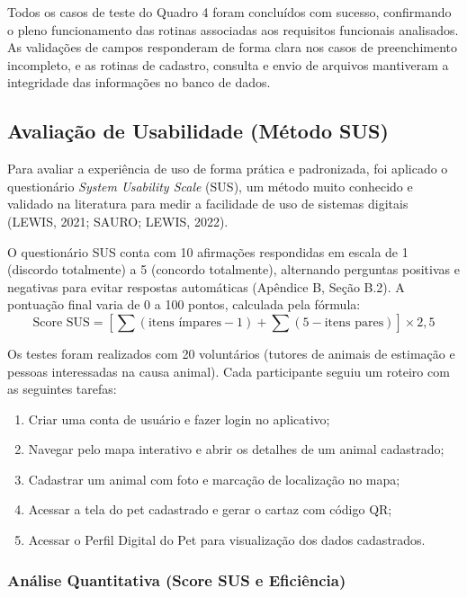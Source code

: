 Todos os casos de teste do Quadro 4 foram concluídos com sucesso, confirmando o pleno funcionamento das rotinas associadas aos requisitos funcionais analisados. As validações de campos responderam de forma clara nos casos de preenchimento incompleto, e as rotinas de cadastro, consulta e envio de arquivos mantiveram a integridade das informações no banco de dados.

\subsection{Avaliação de Usabilidade (Método SUS)}

Para avaliar a experiência de uso de forma prática e padronizada, foi aplicado o questionário \textit{System Usability Scale} (SUS), um método muito conhecido e validado na literatura para medir a facilidade de uso de sistemas digitais (LEWIS, 2021; SAURO; LEWIS, 2022). 

O questionário SUS conta com 10 afirmações respondidas em escala de 1 (discordo totalmente) a 5 (concordo totalmente), alternando perguntas positivas e negativas para evitar respostas automáticas (Apêndice B, Seção B.2). A pontuação final varia de 0 a 100 pontos, calculada pela fórmula:
\begin{equation}
    \text{Score SUS} = \left[ \sum (\text{itens ímpares} - 1) + \sum (5 - \text{itens pares}) \right] \times 2{,}5
\end{equation}

Os testes foram realizados com 20 voluntários (tutores de animais de estimação e pessoas interessadas na causa animal). Cada participante seguiu um roteiro com as seguintes tarefas:
\begin{enumerate}
    \item Criar uma conta de usuário e fazer login no aplicativo;
    \item Navegar pelo mapa interativo e abrir os detalhes de um animal cadastrado;
    \item Cadastrar um animal com foto e marcação de localização no mapa;
    \item Acessar a tela do pet cadastrado e gerar o cartaz com código QR;
    \item Acessar o Perfil Digital do Pet para visualização dos dados cadastrados.
\end{enumerate}

\subsubsection{Análise Quantitativa (Score SUS e Eficiência)}

